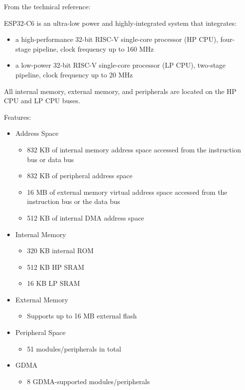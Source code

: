 From the technical reference:

ESP32-C6 is an ultra-low power and highly-integrated system that integrates:
\begin{itemize}
\item a high-performance 32-bit RISC-V single-core processor (HP CPU), four-stage pipeline, clock frequency
up to 160 MHz
\item a low-power 32-bit RISC-V single-core processor (LP CPU), two-stage pipeline, clock frequency up to
20 MHz
\end{itemize}
All internal memory, external memory, and peripherals are located on the HP CPU and LP CPU buses.

Features:
\begin{itemize}
\item Address Space
	\begin{itemize}
	\item 832 KB of internal memory address space accessed from the instruction bus or data bus
	\item 832 KB of peripheral address space
	\item 16 MB of external memory virtual address space accessed from the instruction bus or the data bus
	\item 512 KB of internal DMA address space
	\end{itemize}
\item Internal Memory
	\begin{itemize}
	\item 320 KB internal ROM
	\item 512 KB HP SRAM
	\item 16 KB LP SRAM
	\end{itemize}
\item External Memory
	\begin{itemize}
	\item Supports up to 16 MB external flash
	\end{itemize}
\item Peripheral Space
	\begin{itemize}
	\item 51 modules/peripherals in total
	\end{itemize}
\item GDMA
	\begin{itemize}
	\item 8 GDMA-supported modules/peripherals
	\end{itemize}
\end{itemize}

